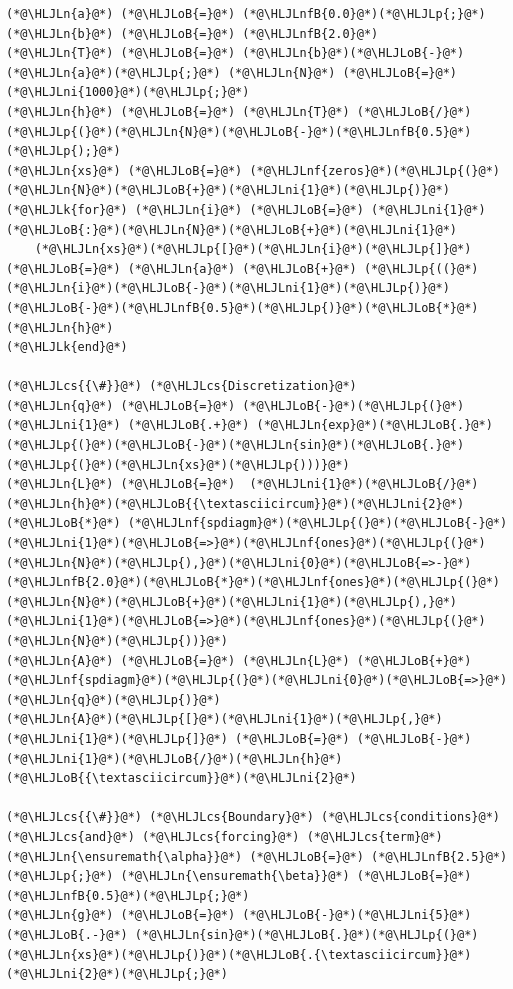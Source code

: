\documentclass[12pt,a4paper]{article}
\newcommand{\HLJLk}[1]{\textcolor[RGB]{148,91,176}{\textbf{#1}}}
\newcommand{\HLJLn}[1]{#1}
\newcommand{\HLJLnf}[1]{\textcolor[RGB]{66,102,213}{#1}}
\newcommand{\HLJLnfB}[1]{\textcolor[RGB]{59,151,46}{#1}}
\newcommand{\HLJLni}[1]{\textcolor[RGB]{59,151,46}{#1}}
\newcommand{\HLJLoB}[1]{\textcolor[RGB]{102,102,102}{\textbf{#1}}}
\newcommand{\HLJLp}[1]{#1}
\newcommand{\HLJLcs}[1]{\textcolor[RGB]{153,153,119}{\textit{#1}}}
\begin{document}
\begin{lstlisting}
(*@\HLJLn{a}@*) (*@\HLJLoB{=}@*) (*@\HLJLnfB{0.0}@*)(*@\HLJLp{;}@*) (*@\HLJLn{b}@*) (*@\HLJLoB{=}@*) (*@\HLJLnfB{2.0}@*)
(*@\HLJLn{T}@*) (*@\HLJLoB{=}@*) (*@\HLJLn{b}@*)(*@\HLJLoB{-}@*)(*@\HLJLn{a}@*)(*@\HLJLp{;}@*) (*@\HLJLn{N}@*) (*@\HLJLoB{=}@*) (*@\HLJLni{1000}@*)(*@\HLJLp{;}@*) 
(*@\HLJLn{h}@*) (*@\HLJLoB{=}@*) (*@\HLJLn{T}@*) (*@\HLJLoB{/}@*) (*@\HLJLp{(}@*)(*@\HLJLn{N}@*)(*@\HLJLoB{-}@*)(*@\HLJLnfB{0.5}@*)(*@\HLJLp{);}@*)
(*@\HLJLn{xs}@*) (*@\HLJLoB{=}@*) (*@\HLJLnf{zeros}@*)(*@\HLJLp{(}@*)(*@\HLJLn{N}@*)(*@\HLJLoB{+}@*)(*@\HLJLni{1}@*)(*@\HLJLp{)}@*)
(*@\HLJLk{for}@*) (*@\HLJLn{i}@*) (*@\HLJLoB{=}@*) (*@\HLJLni{1}@*)(*@\HLJLoB{:}@*)(*@\HLJLn{N}@*)(*@\HLJLoB{+}@*)(*@\HLJLni{1}@*)
    (*@\HLJLn{xs}@*)(*@\HLJLp{[}@*)(*@\HLJLn{i}@*)(*@\HLJLp{]}@*) (*@\HLJLoB{=}@*) (*@\HLJLn{a}@*) (*@\HLJLoB{+}@*) (*@\HLJLp{((}@*)(*@\HLJLn{i}@*)(*@\HLJLoB{-}@*)(*@\HLJLni{1}@*)(*@\HLJLp{)}@*)(*@\HLJLoB{-}@*)(*@\HLJLnfB{0.5}@*)(*@\HLJLp{)}@*)(*@\HLJLoB{*}@*)(*@\HLJLn{h}@*)
(*@\HLJLk{end}@*)

(*@\HLJLcs{{\#}}@*) (*@\HLJLcs{Discretization}@*)
(*@\HLJLn{q}@*) (*@\HLJLoB{=}@*) (*@\HLJLoB{-}@*)(*@\HLJLp{(}@*)(*@\HLJLni{1}@*) (*@\HLJLoB{.+}@*) (*@\HLJLn{exp}@*)(*@\HLJLoB{.}@*)(*@\HLJLp{(}@*)(*@\HLJLoB{-}@*)(*@\HLJLn{sin}@*)(*@\HLJLoB{.}@*)(*@\HLJLp{(}@*)(*@\HLJLn{xs}@*)(*@\HLJLp{)))}@*)
(*@\HLJLn{L}@*) (*@\HLJLoB{=}@*)  (*@\HLJLni{1}@*)(*@\HLJLoB{/}@*)(*@\HLJLn{h}@*)(*@\HLJLoB{{\textasciicircum}}@*)(*@\HLJLni{2}@*) (*@\HLJLoB{*}@*) (*@\HLJLnf{spdiagm}@*)(*@\HLJLp{(}@*)(*@\HLJLoB{-}@*)(*@\HLJLni{1}@*)(*@\HLJLoB{=>}@*)(*@\HLJLnf{ones}@*)(*@\HLJLp{(}@*)(*@\HLJLn{N}@*)(*@\HLJLp{),}@*)(*@\HLJLni{0}@*)(*@\HLJLoB{=>-}@*)(*@\HLJLnfB{2.0}@*)(*@\HLJLoB{*}@*)(*@\HLJLnf{ones}@*)(*@\HLJLp{(}@*)(*@\HLJLn{N}@*)(*@\HLJLoB{+}@*)(*@\HLJLni{1}@*)(*@\HLJLp{),}@*)(*@\HLJLni{1}@*)(*@\HLJLoB{=>}@*)(*@\HLJLnf{ones}@*)(*@\HLJLp{(}@*)(*@\HLJLn{N}@*)(*@\HLJLp{))}@*)
(*@\HLJLn{A}@*) (*@\HLJLoB{=}@*) (*@\HLJLn{L}@*) (*@\HLJLoB{+}@*) (*@\HLJLnf{spdiagm}@*)(*@\HLJLp{(}@*)(*@\HLJLni{0}@*)(*@\HLJLoB{=>}@*)(*@\HLJLn{q}@*)(*@\HLJLp{)}@*)
(*@\HLJLn{A}@*)(*@\HLJLp{[}@*)(*@\HLJLni{1}@*)(*@\HLJLp{,}@*)(*@\HLJLni{1}@*)(*@\HLJLp{]}@*) (*@\HLJLoB{=}@*) (*@\HLJLoB{-}@*)(*@\HLJLni{1}@*)(*@\HLJLoB{/}@*)(*@\HLJLn{h}@*)(*@\HLJLoB{{\textasciicircum}}@*)(*@\HLJLni{2}@*)

(*@\HLJLcs{{\#}}@*) (*@\HLJLcs{Boundary}@*) (*@\HLJLcs{conditions}@*) (*@\HLJLcs{and}@*) (*@\HLJLcs{forcing}@*) (*@\HLJLcs{term}@*) 
(*@\HLJLn{\ensuremath{\alpha}}@*) (*@\HLJLoB{=}@*) (*@\HLJLnfB{2.5}@*)(*@\HLJLp{;}@*) (*@\HLJLn{\ensuremath{\beta}}@*) (*@\HLJLoB{=}@*) (*@\HLJLnfB{0.5}@*)(*@\HLJLp{;}@*)
(*@\HLJLn{g}@*) (*@\HLJLoB{=}@*) (*@\HLJLoB{-}@*)(*@\HLJLni{5}@*) (*@\HLJLoB{.-}@*) (*@\HLJLn{sin}@*)(*@\HLJLoB{.}@*)(*@\HLJLp{(}@*)(*@\HLJLn{xs}@*)(*@\HLJLp{)}@*)(*@\HLJLoB{.{\textasciicircum}}@*)(*@\HLJLni{2}@*)(*@\HLJLp{;}@*)


\end{lstlisting}
\end{document}
